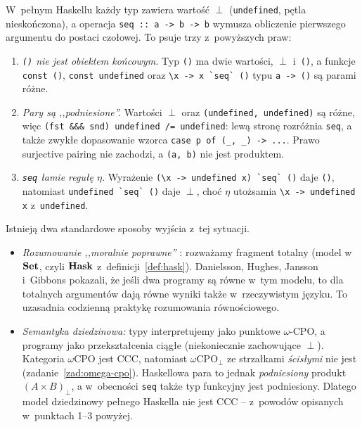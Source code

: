 \begin{uwaga}\label{uw:hask-nie-ccc}
W~pełnym Haskellu każdy typ zawiera wartość $\perp$ (\lstinline{undefined}, pętla nieskończona), a operacja \lstinline{seq :: a -> b -> b} wymusza obliczenie pierwszego argumentu do postaci czołowej. To psuje trzy z~powyższych praw:
\begin{enumerate}
\item \emph{\lstinline{()} nie jest obiektem końcowym.} Typ \lstinline{()} ma dwie wartości, $\perp$ i~\lstinline{()}, a funkcje \lstinline{const ()}, \lstinline{const undefined} oraz \lstinline{\x -> x `seq` ()} typu \lstinline{a -> ()} są parami różne.
\item \emph{Pary są ,,podniesione''.} Wartości $\perp$ oraz \lstinline{(undefined, undefined)} są różne, więc
\lstinline{(fst &&& snd) undefined /= undefined}: lewą stronę rozróżnia \lstinline{seq}, a także zwykłe dopasowanie wzorca \lstinline{case p of (_, _) -> ...}. Prawo surjective pairing nie zachodzi, a \lstinline{(a, b)} nie jest produktem.
\item \emph{\lstinline{seq} łamie regułę $\eta$.} Wyrażenie \lstinline{(\x -> undefined x) `seq` ()} daje \lstinline{()}, natomiast \lstinline{undefined `seq` ()} daje $\perp$, choć $\eta$ utożsamia \lstinline{\x -> undefined x} z~\lstinline{undefined}.
\end{enumerate}
Istnieją dwa standardowe sposoby wyjścia z~tej sytuacji.
\begin{itemize}
\item \emph{Rozumowanie ,,moralnie poprawne''} \cite{tk-danielsson06}: rozważamy fragment totalny (model w~$\mathbf{Set}$, czyli $\mathbf{Hask}$ z~definicji~\ref{def:hask}). Danielsson, Hughes, Jansson i~Gibbons pokazali, że jeśli dwa programy są równe w~tym modelu, to dla totalnych argumentów dają równe wyniki także w~rzeczywistym języku. To uzasadnia codzienną praktykę rozumowania równościowego.
\item \emph{Semantyka dziedzinowa:} typy interpretujemy jako punktowe $\omega$-CPO, a programy jako przekształcenia ciągłe (niekoniecznie zachowujące $\perp$). Kategoria $\omega\mathrm{CPO}$ jest CCC, natomiast $\omega\mathrm{CPO}_\perp$ ze strzałkami \emph{ścisłymi} nie jest (zadanie~\ref{zad:omega-cpo}). Haskellowa para to jednak \emph{podniesiony} produkt $(A\times B)_\perp$, a w~obecności \lstinline{seq} także typ funkcyjny jest podniesiony. Dlatego model dziedzinowy pełnego Haskella nie jest CCC -- z~powodów opisanych w~punktach 1--3 powyżej.
\end{itemize}
\end{uwaga}

